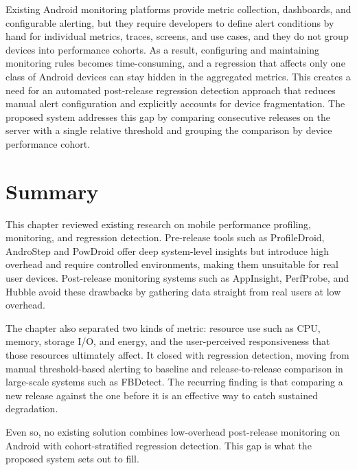 Existing Android monitoring platforms provide metric collection, dashboards, and configurable alerting, but they require developers to define alert conditions by hand for individual metrics, traces, screens, and use cases, and they do not group devices into performance cohorts. As a result, configuring and maintaining monitoring rules becomes time-consuming, and a regression that affects only one class of Android devices can stay hidden in the aggregated metrics. This creates a need for an automated post-release regression detection approach that reduces manual alert configuration and explicitly accounts for device fragmentation. The proposed system addresses this gap by comparing consecutive releases on the server with a single relative threshold and grouping the comparison by device performance cohort.


\section{Summary}
This chapter reviewed existing research on mobile performance profiling, monitoring, and regression detection. Pre-release tools such as ProfileDroid, AndroStep and PowDroid offer deep system-level insights but introduce high overhead and require controlled environments, making them unsuitable for real user devices. Post-release monitoring systems such as AppInsight, PerfProbe, and Hubble avoid these drawbacks by gathering data straight from real users at low overhead.

The chapter also separated two kinds of metric: resource use such as CPU, memory, storage I/O, and energy, and the user-perceived responsiveness that those resources ultimately affect. It closed with regression detection, moving from manual threshold-based alerting to baseline and release-to-release comparison in large-scale systems such as FBDetect. The recurring finding is that comparing a new release against the one before it is an effective way to catch sustained degradation.

Even so, no existing solution combines low-overhead post-release monitoring on Android with cohort-stratified regression detection. This gap is what the proposed system sets out to fill.